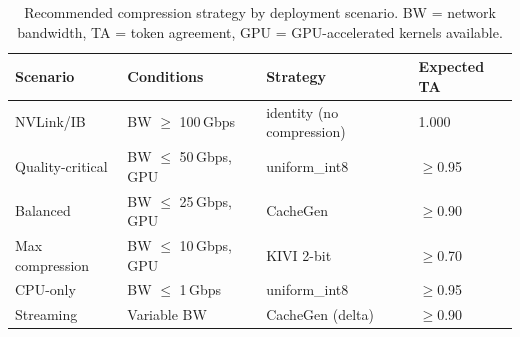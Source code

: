 \begin{table}[t]
\centering
\caption{Recommended compression strategy by deployment scenario. BW = network bandwidth, TA = token agreement, GPU = GPU-accelerated kernels available.}
\label{tab:recipe}
\small
\begin{tabular}{llll}
\toprule
\textbf{Scenario} & \textbf{Conditions} & \textbf{Strategy} & \textbf{Expected TA} \\
\midrule
NVLink/IB & BW $\geq$ 100\,Gbps & identity (no compression) & 1.000 \\
Quality-critical & BW $\leq$ 50\,Gbps, GPU & uniform\_int8 & $\geq$0.95 \\
Balanced & BW $\leq$ 25\,Gbps, GPU & CacheGen & $\geq$0.90 \\
Max compression & BW $\leq$ 10\,Gbps, GPU & KIVI 2-bit & $\geq$0.70 \\
CPU-only & BW $\leq$ 1\,Gbps & uniform\_int8 & $\geq$0.95 \\
Streaming & Variable BW & CacheGen (delta) & $\geq$0.90 \\
\bottomrule
\end{tabular}
\end{table}